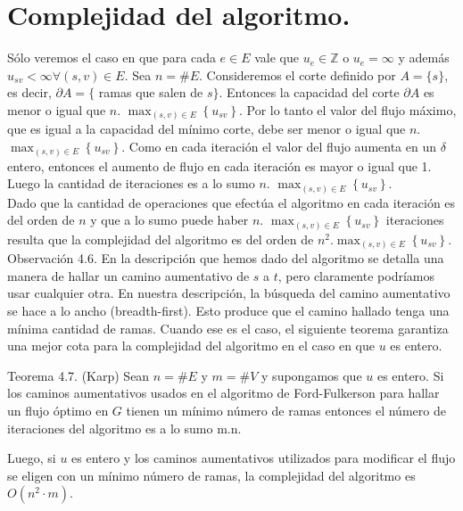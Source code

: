 \documentclass[10pt]{article}
\begin{document}
\section*{Complejidad del algoritmo.}
Sólo veremos el caso en que para cada $e \in E$ vale que $u_{e} \in \mathbb{Z}$ o $u_{e}=\infty$ y además $u_{s v}<\infty \forall(s, v) \in E$. Sea $n=\# E$. Consideremos el corte definido por $A=\{s\}$, es decir, $\partial A=\{$ ramas que salen de $s\}$. Entonces la capacidad del corte $\partial A$ es menor o igual que $n$. $\max _{(s, v) \in E}\left\{u_{s v}\right\}$. Por lo tanto el valor del flujo máximo, que es igual a la capacidad del mínimo corte, debe ser menor o igual que $n$. $\max _{(s, v) \in E}\left\{u_{s v}\right\}$. Como en cada iteración el valor del flujo aumenta en un $\delta$ entero, entonces el aumento de flujo en cada iteración es mayor o igual que 1. Luego la cantidad de iteraciones es a lo sumo $n$. $\max _{(s, v) \in E}\left\{u_{s v}\right\}$.\\
Dado que la cantidad de operaciones que efectúa el algoritmo en cada iteración es del orden de $n$ y que a lo sumo puede haber $n$. $\max _{(s, v) \in E}\left\{u_{s v}\right\}$ iteraciones resulta que la complejidad del algoritmo es del orden de $n^{2} . \max _{(s, v) \in E}\left\{u_{s v}\right\}$.\\
Observación 4.6. En la descripción que hemos dado del algoritmo se detalla una manera de hallar un camino aumentativo de $s$ a $t$, pero claramente podríamos usar cualquier otra. En nuestra descripción, la búsqueda del camino aumentativo se hace a lo ancho (breadth-first). Esto produce que el camino hallado tenga una mínima cantidad de ramas. Cuando ese es el caso, el siguiente teorema garantiza una mejor cota para la complejidad del algoritmo en el caso en que $u$ es entero.

Teorema 4.7. (Karp) Sean $n=\# E$ y $m=\# V$ y supongamos que $u$ es entero. Si los caminos aumentativos usados en el algoritmo de Ford-Fulkerson para hallar un flujo óptimo en $G$ tienen un mínimo número de ramas entonces el número de iteraciones del algoritmo es a lo sumo m.n.

Luego, si $u$ es entero y los caminos aumentativos utilizados para modificar el flujo se eligen con un mínimo número de ramas, la complejidad del algoritmo es $O\left(n^{2} \cdot m\right)$.
\end{document}
